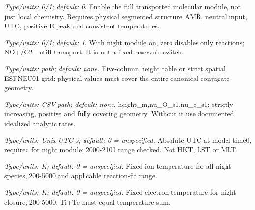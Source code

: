 \begin{description}[style=nextline,leftmargin=0pt,labelindent=0pt,labelwidth=0pt,labelsep=0pt]
\item[\texttt{--night-chemistry}] \textit{Type/units: 0/1; default: 0.} Enable the full transported molecular module, not just local chemistry. Requires physical segmented structure AMR, neutral input, UTC, positive E peak and consistent temperatures.
\item[\texttt{--night-reactions}] \textit{Type/units: 0/1; default: 1.} With night module on, zero disables only reactions; NO+/O2+ still transport. It is not a fixed-reservoir switch.
\item[\texttt{--neutral-profile}] \textit{Type/units: path; default: none.} Five-column height table or strict spatial ESFNEU01 grid; physical values must cover the entire canonical conjugate geometry.
\item[\texttt{--collision-profile}] \textit{Type/units: CSV path; default: none.} height\_m,nu\_O\_s1,nu\_e\_s1; strictly increasing, positive and fully covering geometry. Without it use documented idealized analytic rates.
\item[\texttt{--utc-start-unix}] \textit{Type/units: Unix UTC s; default: 0 = unspecified.} Absolute UTC at model time0, required for night module; 2000-2100 range checked. Not HKT, LST or MLT.
\item[\texttt{--chem-Ti}] \textit{Type/units: K; default: 0 = unspecified.} Fixed ion temperature for all night species, 200-5000 and applicable reaction-fit range.
\item[\texttt{--chem-Te}] \textit{Type/units: K; default: 0 = unspecified.} Fixed electron temperature for night closure, 200-5000. Ti+Te must equal temperature-sum.
\end{description}
